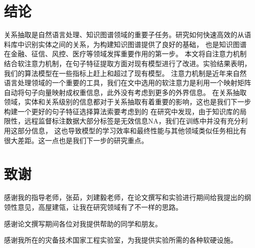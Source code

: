 \documentclass[UTF8]{csoarticle}
\begin{document}
\section{结论}
关系抽取是自然语言处理、知识图谱领域的重要子任务。研究如何快速高效的从语料库中识别实体之间的关系，为构建知识图谱提供了良好的基础，
也是知识图谱在金融、征信、风控、医疗等领域发挥重要作用的第一步。
本文将自注意力机制结合软注意力机制，在句子特征提取方面对现有模型进行了改进。实验结果表明，我们的算法模型在一些指标上赶上和超过了现有模型。
注意力机制是近年来自然语言处理领域的一个重要的工具，我们在文中选用的软注意力是利用一个映射矩阵自动将句子向量映射成权重信息，此外没有考虑到更多的外界信息。
在关系抽取领域，实体和关系级别的信息都对于关系抽取有着重要的影响，这也是我们下一步构建一个更好的句子特征选择算法索要考虑到的
在研究中发现，由于知识库的局限性，远程监督标注数据大部分标签是无效信息NA，我们在训练中并没有充分利用这部分信息，
这也导致模型的学习效率和最终性能与其他领域类似任务相比有很大差距。这一点也是我们下一步的研究重点。
\section*{致谢}
感谢我的指导老师，张茹，刘建毅老师，在论文撰写和实验进行期间给我提出的纲领性意见，高屋建瓴，让我在研究领域有了不一样的思路。

感谢论文撰写期间各位对我提供帮助的同学和朋友。

感谢我所在的灾备技术国家工程实验室，为我提供实验所需的各种软硬设施。
\end{document}
